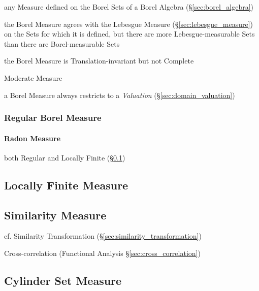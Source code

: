 any Measure defined on the Borel Sets of a Borel Algebra
(\S\ref{sec:borel_algebra})

the Borel Measure agrees with the Lebesgue Measure
(\S\ref{sec:lebesgue_measure}) on the Sets for which it is defined, but there
are more Lebesgue-measurable Sets than there are Borel-measurable Sets

the Borel Measure is Translation-invariant but not Complete

Moderate Measure

\fist a Borel Measure always restricts to a \emph{Valuation}
(\S\ref{sec:domain_valuation})



\subsubsection{Regular Borel Measure}\label{sec:regualr_borel}\hfill

\paragraph{Radon Measure}\label{sec:radon_measure}\hfill

both Regular and Locally Finite (\S\ref{sec:locally_finite_measure})



\subsection{Locally Finite Measure}\label{sec:locally_finite_measure}

\subsection{Similarity Measure}\label{sec:similarity_measure}

\fist cf. Similarity Transformation (\S\ref{sec:similarity_transformation})

Cross-correlation (Functional Analysis \S\ref{sec:cross_correlation})



\subsection{Cylinder Set Measure}\label{sec:cylinder_set_measure}

